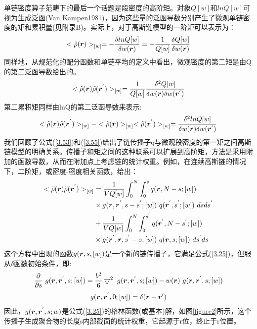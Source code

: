 单链密度算子范畴下的最后一个话题是段密度的高阶矩。对象$Q[w]$和$ln Q[w]$可视为生成泛函(Van Kampen1981)，因为这些量的泛函导数分别产生了微观单链密度的矩和累积量(见附录B)。实际上，对于高斯链模型的一阶矩可以表示为：
\begin{equation}\label{3.70}
<\tilde{\rho}(\bm{r})>_{[w]}=-\frac{\delta lnQ[w]}{\delta w(\bm{r})}=-\frac{1}{Q[w]}\frac{\delta Q[w]}{\delta w(\bm{r})}
\end{equation}
同样地，从规范化的配分函数和单链平均的定义中看出，微观密度的第二矩是由Q的第二泛函导数给出的。
\begin{equation}\label{3.71}
<\tilde{\rho}(\bm{r})\tilde{\rho}(\bm{r}^{'})>_{[w]}=\frac{1}{Q[w]}\frac{\delta^2 Q[w]}{\delta w(\bm{r})\delta  w(\bm{r}^{'})}
\end{equation}
第二累积矩同样由lnQ的第二泛函导数来表示:
\begin{equation}\label{3.72}
<\tilde{\rho}(\bm{r})\tilde{\rho}(\bm{r}^{'})>_{[w]}-<\tilde{\rho}(\bm{r})>_{[w]}<\tilde{\rho}(\bm{r}^{'})>_{[w]}=\frac{\delta^2 lnQ[w]}{\delta w(\bm{r})\delta w(\bm{r}^{'})}
\end{equation}
我们回顾了公式(\ref{3.53})和(\ref{3.55})给出了链传播子q与微观段密度的第一矩之间高斯链模型的明确关系。传播子和矩之间的这种联系可以扩展到高阶矩，方法是采用附加的函数导数，从而在附加点上考虑链的统计权重。例如，在连续高斯链的情况下，二阶矩，或密度-密度相关函数，给出：
\begin{equation}\label{3.73}
\begin{aligned}
<\tilde{\rho}(\bm{r})\tilde{\rho}(\bm{r}^{'})>_{[w]}&=\frac{1}{VQ[w]}\int_{0}^{N} \int_{0}^{s}q(\bm{r},N-s;[w])\\&\times g(\bm{r},\bm{r}^{'},s-s^{'};[w])~q(\bm{r}^{'},s^{'};[w])~dsds^{'}\\&+\frac{1}{VQ[w]}\int_{0}^{N} \int_{0}^{s^{'}}q(\bm{r}^{'},N-s^{'};[w])\\&\times g(\bm{r}^{'},\bm{r},s^{'}-s;[w])~q(\bm{r},s;[w])~ds^{'}ds
\end{aligned}
\end{equation}
这个方程中出现的函数$g(\bm{r},s,[w])$是一个新的链传播子，它满足公式(\ref{3.25})，但服从$\delta$函数初始条件，即:
\begin{equation}\label{3.74}
\frac{\partial}{\partial s}~g(\bm{r},\bm{r}^{'},s;[w])=\frac{b^2}{6}\bigtriangledown^2~g(\bm{r},\bm{r}^{'},s;[w])-w(\bm{r})~g(\bm{r},\bm{r}^{'},s;[w])
\end{equation}
\begin{equation}\label{3.75}
g(\bm{r},\bm{r}^{'},0;[w])=\delta(\bm{r}-\bm{r}{'})
\end{equation}
因此，$g(\bm{r},\bm{r}^{'},s;w)$是公式(\ref{3.25})的格林函数(或基本)解，如图\ref{figure2}所示，这个传播子生成聚合物的长度s内部截面的统计权重，它起源于r位，终止于r位置。

